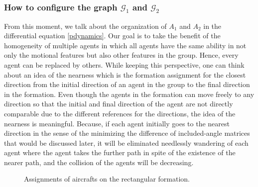 \documentclass[11pt, a4paper, oneside, openany, reqno]{book}
\theoremstyle{definition}
\theoremstyle{remark}
\numberwithin{equation}{chapter} %
\newcommand{\GRP}{\mathcal{G}}
\begin{document}
\subsubsection{How to configure the graph $ \GRP_1 $ and $ \GRP_2 $}
From this moment,
we talk about the organization of $ A_1 $ and $ A_2 $ 
in the differential equation \eqref{pdynamics}.
Our goal is to take the benefit of the homogeneity of multiple agents 
in which all agents have the same ability in not only the motional features 
but also other features in the group.
Hence, every agent can be replaced by others. 
While keeping this perspective, one can think about an idea of the nearness 
which is the formation assignment for the closest direction 
from the initial direction of an agent in the group to the final direction in the formation.
Even though the agents in the formation can move freely to any direction
so that the initial and final direction of the agent are not directly comparable 
due to the different references for the directions,
the idea of the nearness is meaningful.
Because, if each agent initially goes to the nearest direction in the sense of
the minimizing the difference of included-angle matrices that would be discussed later,
it will be eliminated needlessly wandering of each agent where
the agent takes the further path in spite of the existence of the nearer path,
and the collision of the agents will be decreasing.

\begin{figure}[htp]
	\centering
	\caption{Assignments of aircrafts on the rectangular formation.}	
	\label{nearnessfig}
\end{figure}
\end{document}
